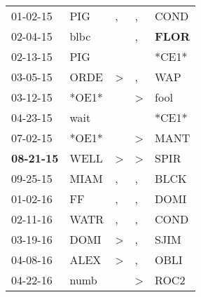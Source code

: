 \begin{supertabular}{p{0.07\textwidth}p{0.06\textwidth}p{0.02\textwidth}p{0.02\textwidth}p{0.06\textwidth}}
          01-02-15\textsuperscript{} &            PIG\textsuperscript{} &                , &                , &           COND\textsuperscript{} \\
          02-04-15\textsuperscript{} &           blbc\textsuperscript{} &                  &                , &  \textbf{FLOR\textsuperscript{}} \\
          02-13-15\textsuperscript{} &            PIG\textsuperscript{} &                  &                  &                            *CE1* \\
          03-05-15\textsuperscript{} &           ORDE\textsuperscript{} &     \textgreater &                , &            WAP\textsuperscript{} \\
          03-12-15\textsuperscript{} &                            *OE1* &                  &     \textgreater &           fool\textsuperscript{} \\
          04-23-15\textsuperscript{} &           wait\textsuperscript{} &                  &                  &                            *CE1* \\
          07-02-15\textsuperscript{} &                            *OE1* &                  &     \textgreater &           MANT\textsuperscript{} \\
 \textbf{08-21-15\textsuperscript{}} &           WELL\textsuperscript{} &     \textgreater &     \textgreater &           SPIR\textsuperscript{} \\
          09-25-15\textsuperscript{} &           MIAM\textsuperscript{} &                , &                , &           BLCK\textsuperscript{} \\
          01-02-16\textsuperscript{} &             FF\textsuperscript{} &                , &                , &           DOMI\textsuperscript{} \\
          02-11-16\textsuperscript{} &           WATR\textsuperscript{} &                , &                , &           COND\textsuperscript{} \\
          03-19-16\textsuperscript{} &           DOMI\textsuperscript{} &     \textgreater &                , &           SJIM\textsuperscript{} \\
          04-08-16\textsuperscript{} &           ALEX\textsuperscript{} &     \textgreater &                , &           OBLI\textsuperscript{} \\
          04-22-16\textsuperscript{} &           numb\textsuperscript{} &                  &     \textgreater &           ROC2\textsuperscript{} \\

\end{supertabular}
